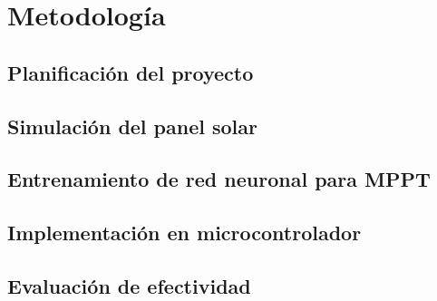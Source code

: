 \chapter{Metodología}

\section{Planificación del proyecto}

\section{Simulación del panel solar}

\section{Entrenamiento de red neuronal para MPPT}

\section{Implementación en microcontrolador}

\section{Evaluación de efectividad}